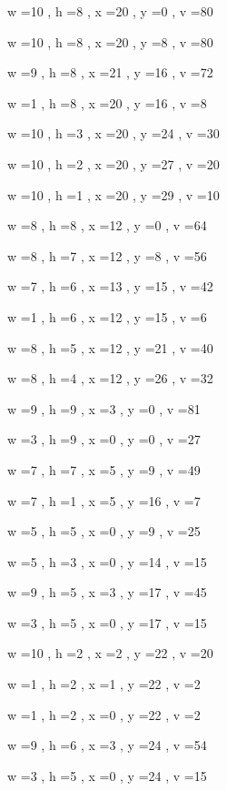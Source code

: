 \documentclass[11pt]{article}
\begin{document}


w =10 , h =8 , x =20 , y =0 , v =80
\par
w =10 , h =8 , x =20 , y =8 , v =80
\par
w =9 , h =8 , x =21 , y =16 , v =72
\par
w =1 , h =8 , x =20 , y =16 , v =8
\par
w =10 , h =3 , x =20 , y =24 , v =30
\par
w =10 , h =2 , x =20 , y =27 , v =20
\par
w =10 , h =1 , x =20 , y =29 , v =10
\par
w =8 , h =8 , x =12 , y =0 , v =64
\par
w =8 , h =7 , x =12 , y =8 , v =56
\par
w =7 , h =6 , x =13 , y =15 , v =42
\par
w =1 , h =6 , x =12 , y =15 , v =6
\par
w =8 , h =5 , x =12 , y =21 , v =40
\par
w =8 , h =4 , x =12 , y =26 , v =32
\par
w =9 , h =9 , x =3 , y =0 , v =81
\par
w =3 , h =9 , x =0 , y =0 , v =27
\par
w =7 , h =7 , x =5 , y =9 , v =49
\par
w =7 , h =1 , x =5 , y =16 , v =7
\par
w =5 , h =5 , x =0 , y =9 , v =25
\par
w =5 , h =3 , x =0 , y =14 , v =15
\par
w =9 , h =5 , x =3 , y =17 , v =45
\par
w =3 , h =5 , x =0 , y =17 , v =15
\par
w =10 , h =2 , x =2 , y =22 , v =20
\par
w =1 , h =2 , x =1 , y =22 , v =2
\par
w =1 , h =2 , x =0 , y =22 , v =2
\par
w =9 , h =6 , x =3 , y =24 , v =54
\par
w =3 , h =5 , x =0 , y =24 , v =15
\par
\newpage
\end{document}
